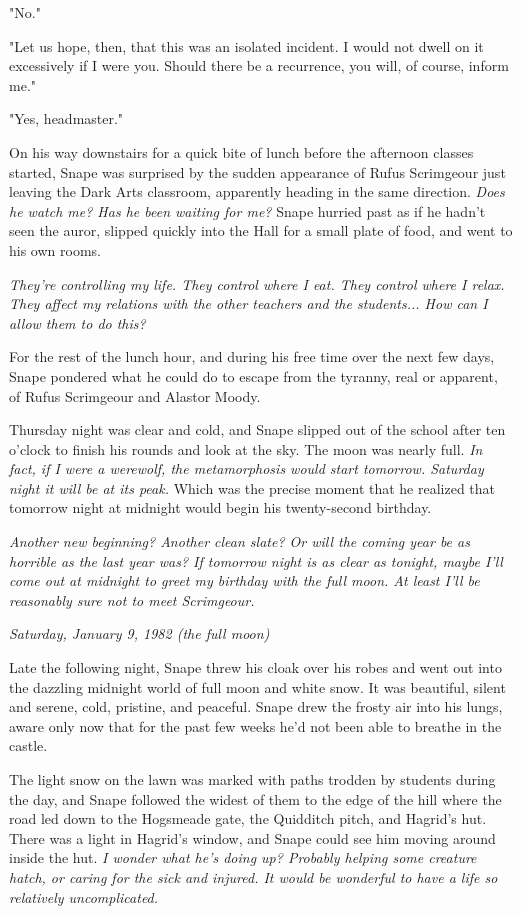 \documentclass[a4paper,11pt]{article}
\begin{document}
"No."

"Let us hope, then, that this was an isolated incident. I would not dwell on it excessively if I were you. Should there be a recurrence, you will, of course, inform me."

"Yes, headmaster."

On his way downstairs for a quick bite of lunch before the afternoon classes started, Snape was surprised by the sudden appearance of Rufus Scrimgeour just leaving the Dark Arts classroom, apparently heading in the same direction. \emph{Does he watch me? Has he been waiting for me?} Snape hurried past as if he hadn't seen the auror, slipped quickly into the Hall for a small plate of food, and went to his own rooms.

\emph{They're controlling my life. They control where I eat. They control where I relax. They affect my relations with the other teachers and the students... How can I allow them to do this?}

For the rest of the lunch hour, and during his free time over the next few days, Snape pondered what he could do to escape from the tyranny, real or apparent, of Rufus Scrimgeour and Alastor Moody.

Thursday night was clear and cold, and Snape slipped out of the school after ten o'clock to finish his rounds and look at the sky. The moon was nearly full. \emph{In fact, if I were a werewolf, the metamorphosis would start tomorrow. Saturday night it will be at its peak. }Which was the precise moment that he realized that tomorrow night at midnight would begin his twenty-second birthday.

\emph{Another new beginning? Another clean slate? Or will the coming year be as horrible as the last year was? If tomorrow night is as clear as tonight, maybe I'll come out at midnight to greet my birthday with the full moon. At least I'll be reasonably sure not to meet Scrimgeour.}

\emph{Saturday, January 9, 1982 (the full moon)}

Late the following night, Snape threw his cloak over his robes and went out into the dazzling midnight world of full moon and white snow. It was beautiful, silent and serene, cold, pristine, and peaceful. Snape drew the frosty air into his lungs, aware only now that for the past few weeks he'd not been able to breathe in the castle.

The light snow on the lawn was marked with paths trodden by students during the day, and Snape followed the widest of them to the edge of the hill where the road led down to the Hogsmeade gate, the Quidditch pitch, and Hagrid's hut. There was a light in Hagrid's window, and Snape could see him moving around inside the hut. \emph{I wonder what he's doing up? Probably helping some creature hatch, or caring for the sick and injured. It would be wonderful to have a life so relatively uncomplicated.}
\end{document}
